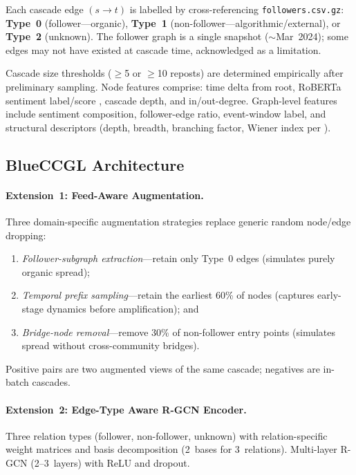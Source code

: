\documentclass[12pt,a4paper]{article}
\begin{document}
Each cascade edge $(s \to t)$ is labelled by cross-referencing
\texttt{followers.csv.gz}: \textbf{Type~0} (follower---organic),
\textbf{Type~1} (non-follower---algorithmic/external), or \textbf{Type~2}
(unknown).  The follower graph is a single snapshot ($\sim$Mar~2024); some edges
may not have existed at cascade time, acknowledged as a limitation.

Cascade size thresholds ($\geq$5 or $\geq$10 reposts) are determined
empirically after preliminary sampling.  Node features comprise: time delta from
root, RoBERTa sentiment label/score \citep{failla2024bluesky}, cascade depth,
and in/out-degree.  Graph-level features include sentiment composition,
follower-edge ratio, event-window label, and structural descriptors (depth,
breadth, branching factor, Wiener index per \citealt{goel2016structural}).

\subsection{BlueCCGL Architecture}

\paragraph{Extension~1: Feed-Aware Augmentation.}
Three domain-specific augmentation strategies replace generic random
node/edge dropping:
\begin{enumerate}[label=\textbf{(\alph*)}]
  \item \emph{Follower-subgraph extraction}---retain only Type~0 edges
        (simulates purely organic spread);
  \item \emph{Temporal prefix sampling}---retain the earliest 60\% of nodes
        (captures early-stage dynamics before amplification); and
  \item \emph{Bridge-node removal}---remove 30\% of non-follower entry points
        (simulates spread without cross-community bridges).
\end{enumerate}
Positive pairs are two augmented views of the same cascade; negatives are
in-batch cascades.

\paragraph{Extension~2: Edge-Type Aware R-GCN Encoder.}
Three relation types (follower, non-follower, unknown) with relation-specific
weight matrices and basis decomposition (2~bases for 3~relations).  Multi-layer
R-GCN (2--3~layers) with ReLU and dropout.
\end{document}
